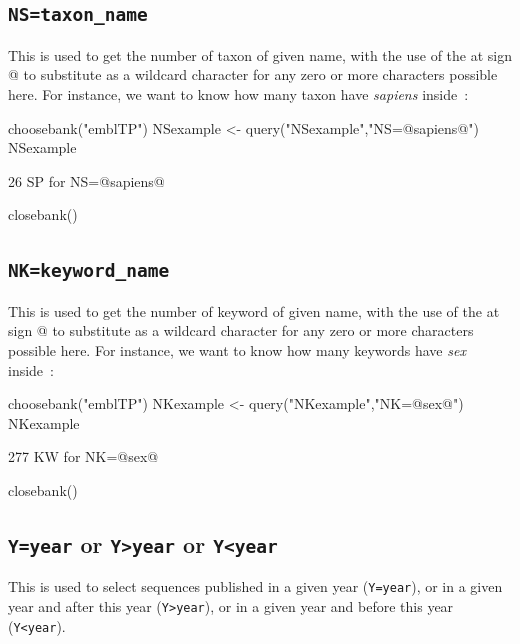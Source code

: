 \documentclass{article}
\begin{document}
\subsection{\texttt{NS=taxon\_name}}

This is used to get the number of taxon of given name, with the use of the at sign @ to 
substitute as a wildcard character for any zero or more characters 
possible here. For instance, we want to know how many taxon have \textit{sapiens} inside~:

\begin{Schunk}
\begin{Sinput}
 choosebank("emblTP")
 NSexample <- query("NSexample","NS=@sapiens@")
 NSexample
\end{Sinput}
\begin{Soutput}
26 SP for NS=@sapiens@
\end{Soutput}
\begin{Sinput}
 closebank()
\end{Sinput}
\end{Schunk}

\subsection{\texttt{NK=keyword\_name}}

This is used to get the number of keyword of given name, with the use of the at sign @ to 
substitute as a wildcard character for any zero or more characters 
possible here. For instance, we want to know how many keywords have \textit{sex} inside~:

\begin{Schunk}
\begin{Sinput}
 choosebank("emblTP")
 NKexample <- query("NKexample","NK=@sex@")
 NKexample
\end{Sinput}
\begin{Soutput}
277 KW for NK=@sex@
\end{Soutput}
\begin{Sinput}
 closebank()
\end{Sinput}
\end{Schunk}

\subsection{\texttt{Y=year} or \texttt{Y>year} or \texttt{Y<year}}

This is used to select sequences published in a given year (\texttt{Y=year}),
or in a given year and after this year (\texttt{Y>year}), or in a given
year and before this year (\texttt{Y<year}).
\end{document}
